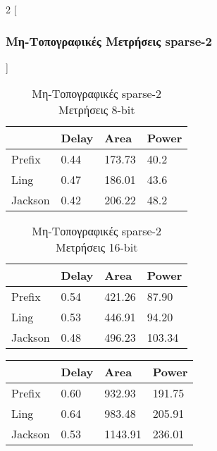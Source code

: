 \begin{multicols}{2}
[\subsubsection{Μη-Τοπογραφικές Μετρήσεις sparse-2}]

\begin{table}[H]
\centering
     \begin{tabular}{||p{1.2cm} | p{0.7cm} p{1cm} p{1cm}||} 
        \hline
        & Delay & Area & Power \\ [0.5ex] 
        \hline\hline
        Prefix  & 0.44  & 173.73    & 40.2 \\ 
        \hline
        Ling    & 0.47  & 186.01    & 43.6 \\
        \hline
        Jackson & 0.42  & 206.22    & 48.2 \\
        \hline
    \end{tabular}
\caption{Μη-Τοπογραφικές sparse-2 Μετρήσεις 8-bit}
\label{sparse2_result_table_8}
\end{table}
\begin{table}[H]
\centering
     \begin{tabular}{||p{1.2cm} | p{0.7cm} p{1cm} p{1cm}||} 
        \hline
        & Delay & Area & Power \\ [0.5ex] 
        \hline\hline
        Prefix  & 0.54  & 421.26    & 87.90 \\ 
        \hline
        Ling    & 0.53  & 446.91    & 94.20 \\
        \hline
        Jackson & 0.48  & 496.23    & 103.34 \\
        \hline
    \end{tabular}
\caption{Μη-Τοπογραφικές sparse-2 Μετρήσεις 16-bit}
\label{sparse2_result_table_16}
\end{table}
\begin{table}[H]
\centering
     \begin{tabular}{||p{1.2cm} | p{0.7cm} p{1cm} p{1cm}||} 
        \hline
         & Delay & Area & Power \\ [0.5ex] 
        \hline\hline
        Prefix  & 0.60  & 932.93    & 191.75 \\ 
        \hline
        Ling    & 0.64  & 983.48    &  205.91 \\
        \hline
        Jackson & 0.53  & 1143.91    & 236.01 \\

\end{tabular}
\end{table}
\end{multicols}
